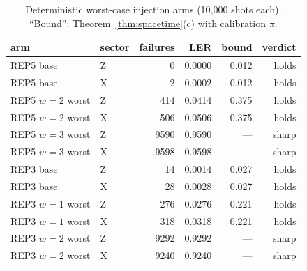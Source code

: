 \documentclass[11pt,a4paper]{article}
\begin{document}
\begin{table}[H]\centering\small
\caption{Deterministic worst-case injection arms (10{,}000 shots each).
``Bound'': Theorem~\ref{thm:spacetime}(c) with calibration $\pi$.}
\label{tab:injdet}
\begin{tabular}{@{}llrrrr@{}}
\toprule
arm & sector & failures & LER & bound & verdict \\\midrule
REP5 base & Z & 0 & 0.0000 & 0.012 & holds \\
REP5 base & X & 2 & 0.0002 & 0.012 & holds \\
REP5 $w{=}2$ worst & Z & 414 & 0.0414 & 0.375 & holds \\
REP5 $w{=}2$ worst & X & 506 & 0.0506 & 0.375 & holds \\
REP5 $w{=}3$ worst & Z & 9590 & 0.9590 & --- & sharp \\
REP5 $w{=}3$ worst & X & 9598 & 0.9598 & --- & sharp \\
REP3 base & Z & 14 & 0.0014 & 0.027 & holds \\
REP3 base & X & 28 & 0.0028 & 0.027 & holds \\
REP3 $w{=}1$ worst & Z & 276 & 0.0276 & 0.221 & holds \\
REP3 $w{=}1$ worst & X & 318 & 0.0318 & 0.221 & holds \\
REP3 $w{=}2$ worst & Z & 9292 & 0.9292 & --- & sharp \\
REP3 $w{=}2$ worst & X & 9240 & 0.9240 & --- & sharp \\\bottomrule
\end{tabular}
\end{table}
\end{document}
